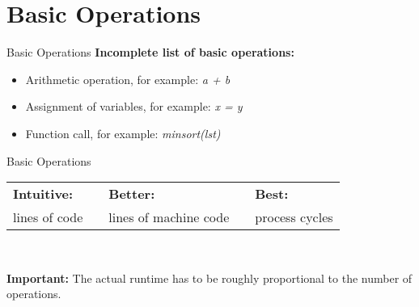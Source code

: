 \section{Basic Operations}

\begin{frame}{Basic Operations}
  \textbf{Incomplete list of basic operations:}
  \begin{center}
    \begin{itemize}
      \item
        Arithmetic operation, for example: \textit{a + b}
      \item
        Assignment of variables, for example: \textit{x = y}
      \item
        Function call, for example: \textit{minsort(lst)}
    \end{itemize}
  \end{center}
\end{frame}


\begin{frame}{Basic Operations}
  \begin{tabularx}{\textwidth}{@{}XcXcX@{}}
    \cellcolor{MainA} {\color{white}\textbf{Intuitive:}} &
    {} &
    \cellcolor{MainA} {\color{white}\textbf{Better:}} &
    {} &
    \cellcolor{MainA} {\color{white}\textbf{Best:}}\\[0.5em]
    \rule{0pt}{1.25em}\cellcolor{MainALight}lines of code &
    {} &
    \cellcolor{MainALight}lines of machine code &
    {} &
    \cellcolor{MainALight}process cycles
  \end{tabularx}\\[1.5em]
  \begin{alertblock}{\textbf{Important:}}
    The actual runtime has to be roughly proportional
    to the number of operations.
  \end{alertblock}
\end{frame}
